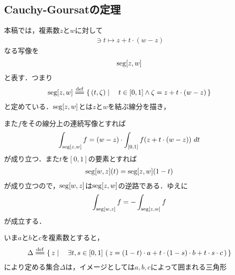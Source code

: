 \subsection{Cauchy-Goursatの定理}
	本稿では，複素数$z$と$w$に対して
	\begin{align}
		[0,1] \ni t \longmapsto z + t \cdot (w - z)
	\end{align}
	なる写像を
	\begin{align}
		\operatorname{seg}[z,w]
	\end{align}
	と表す．つまり
	\begin{align}
		\seg{z}{w} \defeq \Set{(t,\zeta)}{t \in [0,1] \wedge \zeta = z + t \cdot (w - z)}
	\end{align}
	と定めている．$\operatorname{seg}[z,w]$とは$z$と$w$を結ぶ線分を描き，
	
	\begin{center}
	\end{center}
	
	また$f$をその線分上の連続写像とすれば
	\begin{align}
		\int_{\operatorname{seg}[z,w]} f = (w-z) \cdot \int_{[0,1]} f(z + t \cdot (w - z))\ dt
	\end{align}
	が成り立つ．また$t$を$[0,1]$の要素とすれば
	\begin{align}
		\operatorname{seg}[w,z](t) = \operatorname{seg}[z,w](1 - t)
	\end{align}
	が成り立つので，$\operatorname{seg}[w,z]$は$\operatorname{seg}[z,w]$の逆路である．ゆえに
	\begin{align}
		\int_{\operatorname{seg}[w,z]} f = - \int_{\operatorname{seg}[z,w]} f
	\end{align}
	が成立する．
	
	いま$a$と$b$と$c$を複素数とすると，
	\begin{align}
		\Delta \defeq \Set{z}{\exists t,s \in [0,1]\, 
		\left(\, z = (1-t) \cdot a 
		+ t \cdot (1-s) \cdot b 
		+ t \cdot s \cdot c\, \right)}
	\end{align}
	により定める集合$\Delta$は，イメージとしては$a,b,c$によって囲まれる三角形
	
	\begin{center}
	\end{center}
	
